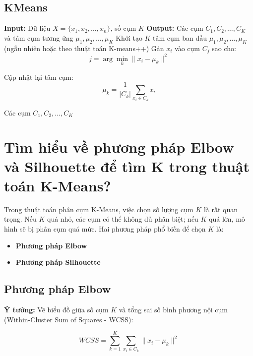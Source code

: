 \documentclass[12pt]{article}
\begin{document}
	\subsection*{KMeans}
	
	\begin{algorithm}[H]
	\begin{algorithmic}[1]
	\State \textbf{Input:} Dữ liệu $X = \{x_1, x_2, \dots, x_n\}$, số cụm $K$
	\State \textbf{Output:} Các cụm $C_1, C_2, \dots, C_K$ và tâm cụm tương ứng $\mu_1, \mu_2, \dots, \mu_K$
	\State Khởi tạo $K$ tâm cụm ban đầu $\mu_1, \mu_2, \dots, \mu_K$ (ngẫu nhiên hoặc theo thuật toán K-means++)
	\Repeat
	\State Gán $x_i$ vào cụm $C_j$ sao cho:
	\[
	j = \arg\min_k \|x_i - \mu_k\|^2
	\]
	\EndFor
	
	\State Cập nhật lại tâm cụm:
	\[
	\mu_k = \frac{1}{|C_k|} \sum_{x_i \in C_k} x_i
	\]
	\EndFor
	
	\State \Return Các cụm $C_1, C_2, \dots, C_K$
	\end{algorithmic}
	\end{algorithm}
	
	\section{Tìm hiểu về phương pháp Elbow và Silhouette để tìm K trong thuật toán K-Means?}
	
	Trong thuật toán phân cụm K-Means, việc chọn số lượng cụm $K$ là rất quan trọng. Nếu $K$ quá nhỏ, các cụm có thể không đủ phân biệt; nếu $K$ quá lớn, mô hình sẽ bị phân cụm quá mức. Hai phương pháp phổ biến để chọn $K$ là:
	
	\begin{itemize}
	\item \textbf{Phương pháp Elbow}
	\item \textbf{Phương pháp Silhouette}
	\end{itemize}
	
	\subsection{Phương pháp Elbow}
	
	\textbf{Ý tưởng:} Vẽ biểu đồ giữa số cụm $K$ và tổng sai số bình phương nội cụm (Within-Cluster Sum of Squares - WCSS):
	
	\[
	WCSS = \sum_{k=1}^{K} \sum_{x_i \in C_k} \|x_i - \mu_k\|^2
	\]
	
\end{document}
